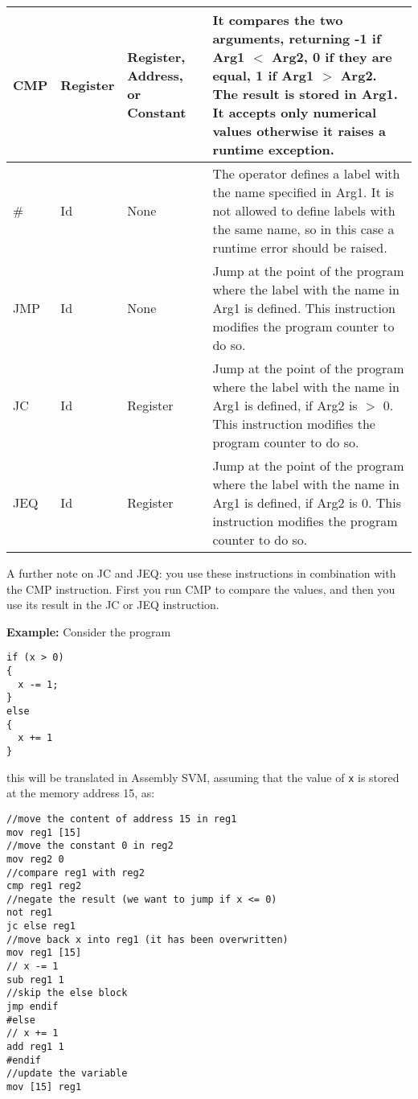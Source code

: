 \begin{longtable}{|p{1cm}|p{2cm}|p{2cm}|p{5cm}|}
	\hline
	CMP & Register & Register, Address, or Constant & It compares the two arguments, returning -1 if Arg1 $<$ Arg2, 0 if they are equal, 1 if Arg1 $>$ Arg2. The result is stored in Arg1. It accepts only numerical values otherwise it raises a runtime exception. \\
	\hline
	\# & Id & None & The operator defines a label with the name specified in Arg1. It is not allowed to define labels with the same name, so in this case a runtime error should be raised. \\
	\hline
	JMP & Id & None & Jump at the point of the program where the label with the name in Arg1 is defined. This instruction modifies the program counter to do so. \\
	\hline
	JC & Id & Register & Jump at the point of the program where the label with the name in Arg1 is defined, if Arg2 is $>$ 0. This instruction modifies the program counter to do so. \\
	\hline
	JEQ & Id & Register & Jump at the point of the program where the label with the name in Arg1 is defined, if Arg2 is 0. This instruction modifies the program counter to do so. \\
	\hline
\end{longtable}

\noindent
A further note on JC and JEQ: you use these instructions in combination with the CMP instruction. First you run CMP to compare the values, and then you use its result in the JC or JEQ instruction.

\vspace{0.5cm}
\noindent
\textbf{Example:} Consider the program

\begin{lstlisting}
if (x > 0)
{
  x -= 1;
}
else
{
  x += 1
}
\end{lstlisting}

\noindent
this will be translated in Assembly SVM, assuming that the value of \texttt{x} is stored at the memory address 15, as:

\begin{lstlisting}
//move the content of address 15 in reg1
mov reg1 [15]
//move the constant 0 in reg2
mov reg2 0 
//compare reg1 with reg2
cmp reg1 reg2
//negate the result (we want to jump if x <= 0)
not reg1
jc else reg1
//move back x into reg1 (it has been overwritten)
mov reg1 [15]
// x -= 1
sub reg1 1
//skip the else block 
jmp endif
#else
// x += 1
add reg1 1
#endif
//update the variable
mov [15] reg1
\end{lstlisting}